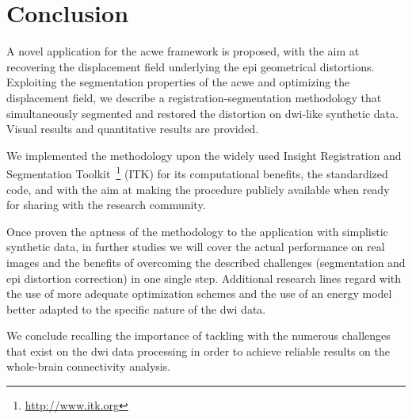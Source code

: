 \section{Conclusion}
\label{sec:conclusion}
%
A novel application for the \gls{acwe} framework is proposed,
with the aim at recovering the displacement field underlying 
the \gls{epi} geometrical distortions. Exploiting the segmentation
properties of the \gls{acwe} and optimizing the displacement
field, we describe a registration-segmentation methodology that
simultaneously segmented and restored the distortion on 
\gls{dwi}-like synthetic data. Visual results and quantitative
results are provided.

We implemented the methodology upon the widely used
Insight Registration and Segmentation 
Toolkit~\footnote{\url{http://www.itk.org}} (ITK)
for its computational benefits, the standardized code, and 
with the aim at making the procedure publicly available 
when ready for sharing with the research community.

Once proven the aptness of the methodology to the application
with simplistic synthetic data, in further studies we will 
cover the actual performance on real images and the benefits 
of overcoming the described challenges (segmentation and 
\gls{epi} distortion correction) in one single step. Additional
research lines regard with the use of more adequate 
optimization schemes and the use of an energy model 
better adapted to the specific nature of the \gls{dwi} data.

We conclude recalling the importance of tackling with
the numerous challenges that exist on the \gls{dwi} data 
processing in order to achieve reliable results on the
whole-brain connectivity analysis.
